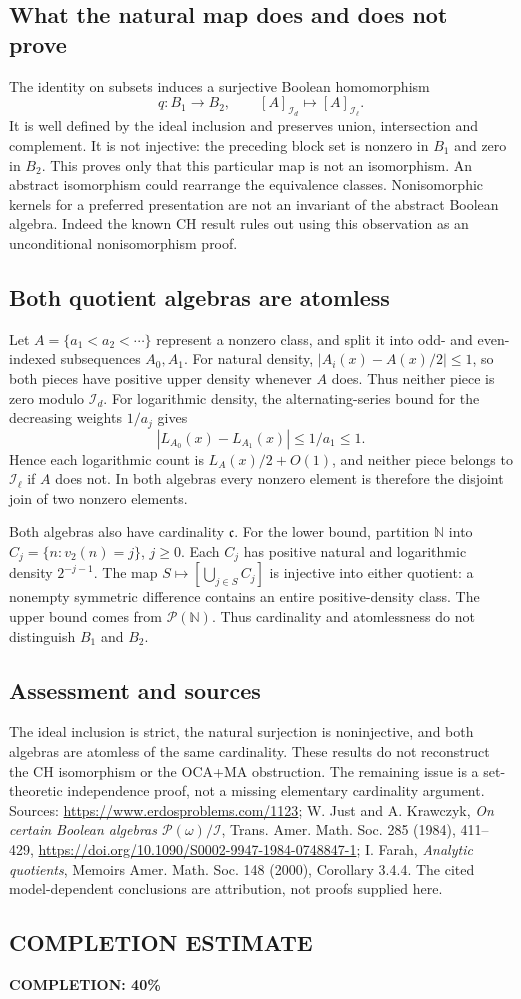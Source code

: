 \subsection*{What the natural map does and does not prove}
The identity on subsets induces a surjective Boolean homomorphism
\[
 q:B_1\longrightarrow B_2,\qquad [A]_{\mathcal I_d}\longmapsto[A]_{\mathcal I_\ell}.
\]
It is well defined by the ideal inclusion and preserves union, intersection and complement. It is not injective: the preceding block set is nonzero in $B_1$ and zero in $B_2$.
This proves only that this particular map is not an isomorphism. An abstract isomorphism could rearrange the equivalence classes. Nonisomorphic kernels for a preferred presentation are not an invariant of the abstract Boolean algebra. Indeed the known CH result rules out using this observation as an unconditional nonisomorphism proof.

\subsection*{Both quotient algebras are atomless}
Let $A=\{a_1<a_2<\cdots\}$ represent a nonzero class, and split it into odd- and even-indexed subsequences $A_0,A_1$. For natural density, $|A_i(x)-A(x)/2|\le1$, so both pieces have positive upper density whenever $A$ does. Thus neither piece is zero modulo $\mathcal I_d$.
For logarithmic density, the alternating-series bound for the decreasing weights $1/a_j$ gives
\[
 |L_{A_0}(x)-L_{A_1}(x)|\le1/a_1\le1.
\]
Hence each logarithmic count is $L_A(x)/2+O(1)$, and neither piece belongs to $\mathcal I_\ell$ if $A$ does not. In both algebras every nonzero element is therefore the disjoint join of two nonzero elements.

Both algebras also have cardinality $\mathfrak c$. For the lower bound, partition $\mathbb N$ into $C_j=\{n:v_2(n)=j\}$, $j\ge0$. Each $C_j$ has positive natural and logarithmic density $2^{-j-1}$. The map $S\mapsto[\bigcup_{j\in S}C_j]$ is injective into either quotient: a nonempty symmetric difference contains an entire positive-density class. The upper bound comes from $\mathcal P(\mathbb N)$. Thus cardinality and atomlessness do not distinguish $B_1$ and $B_2$.

\subsection*{Assessment and sources}
The ideal inclusion is strict, the natural surjection is noninjective, and both algebras are atomless of the same cardinality. These results do not reconstruct the CH isomorphism or the OCA+MA obstruction. The remaining issue is a set-theoretic independence proof, not a missing elementary cardinality argument.
Sources: \url{https://www.erdosproblems.com/1123}; W. Just and A. Krawczyk, \emph{On certain Boolean algebras $\mathcal P(\omega)/\mathcal I$}, Trans. Amer. Math. Soc. 285 (1984), 411--429, \url{https://doi.org/10.1090/S0002-9947-1984-0748847-1}; I. Farah, \emph{Analytic quotients}, Memoirs Amer. Math. Soc. 148 (2000), Corollary 3.4.4. The cited model-dependent conclusions are attribution, not proofs supplied here.
\subsection*{COMPLETION ESTIMATE}
\textbf{COMPLETION: 40\%}
